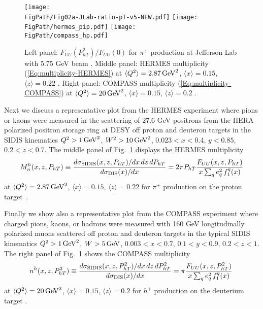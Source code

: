 \documentclass[a4paper,11pt]{article}
\newcommand{\be}{\begin{equation}}
\newcommand{\ee}{\end{equation}}
\newcommand{\la}{\langle}
\newcommand{\ra}{\rangle}
\def\Phperp{P_{hT}}
\newcommand*{\FigPath}{./figs}%
\begin{document}
\begin{figure}[t!]
\centering
\texttt{[image: \\FigPath/Fig02a-JLab-ratio-pT-v5-NEW.pdf]}  \quad
\texttt{[image: \\FigPath/hermes\_pip.pdf]} \quad
\texttt{[image: \\FigPath/compass\_hp.pdf]} 
\caption{\label{FUU-show-pT-dependence}
Left panel: 
	$F_{UU}(P_{hT}^2)/F_{UU}(0)$ for $\pi^+$ 
	production 
	at Jefferson Lab with 5.75 GeV beam \cite{Osipenko:2008aa}.
Middle panel: 
	HERMES multiplicity (\ref{Eq:multiplicity-HERMES}) at 
	$\la Q^2\ra=2.87\,{\rm GeV}^2$, $\la x\ra  =0.15$, $\la z\ra  =0.22$
	 \cite{Airapetian:2012ki}.
Right panel: 
	COMPASS multiplicity (\ref{Eq:multiplicity-COMPASS}) at 
	$\la Q^2\ra=20\,{\rm GeV}^2$, $\la x\ra  =0.15$, $\la z\ra  =0.2$
	 \cite{Aghasyan:2017ctw}.}
\end{figure}

Next we discuss a representative plot from the HERMES experiment 
where pions or kaons were measured in the scattering of 27.6 GeV 
positrons from the HERA polarized positron storage ring at DESY 
off proton and deuteron targets in the SIDIS kinematics 
$Q^2 > 1 \,{\rm GeV}^2$, $W^{2} > 10\,{\rm GeV}^{2}$, 
$0.023 < x < 0.4$, $y < 0.85$, $0.2<z<0.7$. 
The middle panel of Fig.~\ref{FUU-show-pT-dependence} displays the 
HERMES multiplicity~\cite{Airapetian:2012ki}
\be\label{Eq:multiplicity-HERMES}
	M_n^h(x,z,\Phperp) \equiv 
	\frac{d\sigma_{\rm SIDIS}(x,z,\Phperp)/dx\,dz\,d\Phperp}
	{d\sigma_{\rm DIS}(x)/dx} =
	2 \pi \Phperp \frac{F_{UU}(x,z,\Phperp) }{ x \sum_q e_q^2\,f^q_1(x)}
\ee
at $\la Q^2\ra=2.87\,{\rm GeV}^2$, $\la x\ra=0.15$, $\la z\ra=0.22$ 
for $\pi^+$ production on the proton target~\cite{Airapetian:2012ki}.

Finally we show also a representative plot from the COMPASS experiment 
where charged pions, kaons, or hadrons were measured with 160 GeV 
longitudinally polarized muons scattered off proton and deuteron 
targets in the typical SIDIS kinematics 
$Q^2 > 1 \,{\rm GeV}^2$, $W > 5\,{\rm GeV}$, 
$0.003 < x < 0.7$, $0.1<y < 0.9$, $0.2<z<1$. 
The right panel of
Fig.~\ref{FUU-show-pT-dependence} shows the COMPASS multiplicity 
\cite{Aghasyan:2017ctw}
\be\label{Eq:multiplicity-COMPASS}
	n^h(x,z,\Phperp^2)  \equiv 
	\frac{d\sigma_{\rm SIDIS}(x,z,\Phperp^2)/dx\,dz\,d\Phperp^2}
	{d\sigma_{\rm DIS}(x)/dx} =
	\pi \frac{F_{UU}(x,z,\Phperp^2) }{ x \sum_q e_q^2\,f^q_1(x)}\;
\ee
at $\la Q^2\ra=20\,{\rm GeV}^2$, $\la x\ra  =0.15$, $\la z\ra  =0.2$ 
for $h^+$ production on the deuterium target \cite{Aghasyan:2017ctw}.
\end{document}
